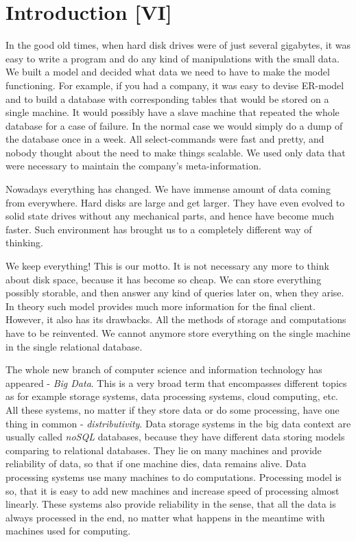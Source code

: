 \chapter{Introduction [VI]}
\label{chap:introduction}

In the good old times, when hard disk drives were of just several gigabytes, it was easy to write a program and do any kind of manipulations with the small data.
We built a model and decided what data we need to have to make the model functioning.
For example, if you had a company, it was easy to devise ER-model and to build a database with corresponding tables that would be stored on a single machine.
It would possibly have a slave machine that repeated the whole database for a case of failure.
In the normal case we would simply do a dump of the database once in a week.
All select-commands were fast and pretty, and nobody thought about the need to make things scalable.
We used only data that were necessary to maintain the company's meta-information.

Nowadays everything has changed.
We have immense amount of data coming from everywhere.
Hard disks are large and get larger.
They have even evolved to solid state drives without any mechanical parts, and hence have become much faster.
Such environment has brought us to a completely different way of thinking.

We keep everything!
This is our motto.
It is not necessary any more to think about disk space, because it has become so cheap.
We can store everything possibly storable, and then answer any kind of queries later on, when they arise.
In theory such model provides much more information for the final client.
However, it also has its drawbacks.
All the methods of storage and computations have to be reinvented.
We cannot anymore store everything on the single machine in the single relational database.

The whole new branch of computer science and information technology has appeared - \textit{Big Data}.
This is a very broad term that encompasses different topics as for example storage systems, data processing systems, cloud computing, etc.
All these systems, no matter if they store data or do some processing, have one thing in common - \textit{distributivity}.
Data storage systems in the big data context are usually called \textit{noSQL} databases, because they have different data storing models comparing to relational databases.
They lie on many machines and provide reliability of data, so that if one machine dies, data remains alive.
Data processing systems use many machines to do computations.
Processing model is so, that it is easy to add new machines and increase speed of processing almost linearly.
These systems also provide reliability in the sense, that all the data is always processed in the end, no matter what happens in the meantime with machines used for computing.

